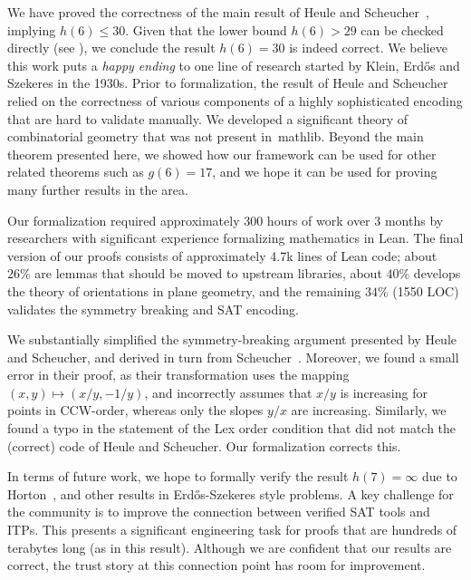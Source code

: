 We have proved the correctness of the main result of Heule and Scheucher~\cite{emptyHexagonNumber},
implying $h(6) \leq 30$.
Given that the lower bound $h(6) > 29$ can be checked directly (see \cite{emptyHexagonNumber}),
we conclude the result $h(6) = 30$ is indeed correct.
We believe this work puts a \emph{happy ending} to
one line of research started by Klein, Erd\H{o}s and Szekeres in the 1930s.
Prior to formalization, the result of Heule and Scheucher
relied on the correctness of various components of a highly sophisticated encoding
that are hard to validate manually.
We developed a significant theory of combinatorial geometry
that was not present in~\textsf{mathlib}.
Beyond the main theorem presented here,
we showed how our framework can be used for other related theorems
such as $g(6) = 17$,
and we hope it can be used for proving many further results in the area.

Our formalization required approximately 300 hours of work over 3 months
by researchers with significant experience formalizing mathematics in Lean.
The final version of our proofs consists of approximately 4.7k lines of Lean code;
about $26\%$ are lemmas that should be moved to upstream libraries,
about $40\%$ develops the theory of orientations in plane geometry,
and the remaining $34\%$ (1550 LOC) validates the symmetry breaking and SAT encoding.

We substantially simplified the symmetry-breaking argument presented by Heule and Scheucher,
and derived in turn from Scheucher~\cite{scheucherTwoDisjoint5holes2020}.
Moreover, we found a small error in their proof,
as their transformation uses the mapping $(x, y) \mapsto (x/y, -1/y)$,
and incorrectly assumes that $x/y$ is increasing for points in CCW-order,
whereas only the slopes $y/x$ are increasing.
Similarly, we found a typo in the statement of the \textsf{Lex order} condition
that did not match the (correct) code of Heule and Scheucher.
Our formalization corrects this.

In terms of future work,
we hope to formally verify the result $h(7) = \infty$ due to Horton~\cite{hortonSetsNoEmpty1983},
and other results in Erd\H{o}s-Szekeres style problems.
A key challenge for the community
is to improve the connection between verified SAT tools and ITPs.
This presents a significant engineering task
for proofs that are hundreds of terabytes long (as in this result).
Although we are confident that our results are correct,
the trust story at this connection point has room for improvement.
